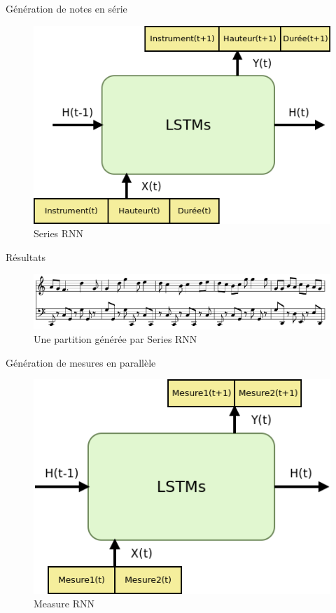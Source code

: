 \documentclass{beamer}
\begin{document}
\begin{frame}{Génération de notes en série}
\begin{figure}
\begin{center}
\includegraphics[scale=0.5]{images/series_rnn.png}
\caption{Series RNN}
\end{center}
\end{figure}
\end{frame}

\begin{frame}{Résultats}
\begin{figure}
\begin{center}
\includegraphics[scale=0.3]{images/series_rnn_result.png}
\caption{Une partition générée par Series RNN}
\end{center}
\end{figure}
\end{frame}

\begin{frame}{Génération de mesures en parallèle}
\begin{figure}
\begin{center}
\includegraphics[scale=0.5]{images/measure_rnn.png}
\caption{Measure RNN}
\end{center}
\end{figure}
\end{frame}
\end{document}
